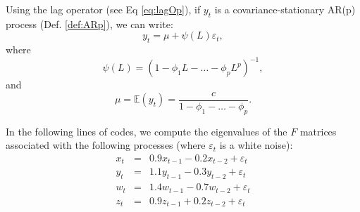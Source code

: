 \documentclass[
  12pt,
]{book}
\newenvironment{Shaded}{\begin{snugshade}}{\end{snugshade}}
\newcommand{\DecValTok}[1]{\textcolor[rgb]{0.00,0.00,0.81}{#1}}
\newcommand{\FloatTok}[1]{\textcolor[rgb]{0.00,0.00,0.81}{#1}}
\newcommand{\FunctionTok}[1]{\textcolor[rgb]{0.00,0.00,0.00}{#1}}
\newcommand{\NormalTok}[1]{#1}
\newcommand{\OtherTok}[1]{\textcolor[rgb]{0.56,0.35,0.01}{#1}}
\newcommand{\SpecialCharTok}[1]{\textcolor[rgb]{0.00,0.00,0.00}{#1}}
\theoremstyle{definition}
\theoremstyle{definition}
\theoremstyle{definition}
\theoremstyle{definition}
\theoremstyle{remark}
\begin{document}
Using the lag operator (see Eq \eqref{eq:lagOp}), if \(y_t\) is a covariance-stationary AR(p) process (Def. \ref{def:ARp}), we can write:
\[
y_t = \mu + \psi(L)\varepsilon_t,
\]
where
\begin{equation}
\psi(L) = (1 - \phi_1 L - \dots - \phi_p L^p)^{-1},
\end{equation}
and
\begin{equation}
\mu = \mathbb{E}(y_t) = \dfrac{c}{1-\phi_1 -\dots - \phi_p}.\label{eq:EAR}
\end{equation}

In the following lines of codes, we compute the eigenvalues of the \(F\) matrices associated with the following processes (where \(\varepsilon_t\) is a white noise):
\begin{eqnarray*}
x_t &=& 0.9 x_{t-1} -0.2 x_{t-2} + \varepsilon_t\\
y_t &=& 1.1 y_{t-1} -0.3 y_{t-2} + \varepsilon_t\\
w_t &=& 1.4 w_{t-1} -0.7 w_{t-2} + \varepsilon_t\\
z_t &=& 0.9 z_{t-1} +0.2 z_{t-2} + \varepsilon_t
\end{eqnarray*}

\begin{Shaded}
\end{Shaded}
\end{document}
